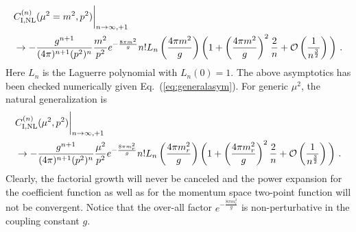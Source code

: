 \documentclass[a4paper,11pt]{article}
\begin{document}
\begin{align}\label{eq:asymfinal1}
& C_{{\rm I},{\rm NL}}^{(n)}(\mu^2=m^2,p^2)\bigg|_{n\rightarrow \infty,+1}\ \nonumber \\ 
& \rightarrow -\frac{g^{n+1}}{(4\pi)^{n+1}(p^2)^{n}}\frac{m^2}{p^2}e^{-\frac{8\pi m^2}{g}}n!L_n\left(\frac{4\pi m^2}{g}\right)\bigg(1+\left(\frac{4\pi m^2}{g}\right)^2\frac{2}{n}+{\cal O}\left(\frac{1}{n^{\frac{3}{2}}}\right)\bigg) \ .
\end{align}
Here $L_n$ is the Laguerre polynomial with $L_n(0)=1$. The above asymptotics  has been checked numerically given Eq.~(\ref{eq:generalasym}). For generic $\mu^2$, the natural generalization is 
\begin{align}\label{eq:asymfinal2}
& C_{{\rm I},{\rm NL}}^{(n)}(\mu^2,p^2)\bigg|_{n\rightarrow \infty,+1}\ \nonumber \\ 
& \rightarrow -\frac{g^{n+1}}{(4\pi)^{n+1}(p^2)^{n}}\frac{\mu^2}{p^2}e^{-\frac{8\pi m_r^2}{g}}n!L_n\left(\frac{4\pi m_r^2}{g}\right)\bigg(1+\left(\frac{4\pi m_r^2}{g}\right)^2\frac{2}{n}+{\cal O}\left(\frac{1}{n^{\frac{3}{2}}}\right)\bigg) \ .
\end{align}
Clearly, the factorial growth will never be canceled and the power expansion for the coefficient function as well as for the momentum space two-point function will not be convergent. Notice that the over-all factor $e^{-\frac{8\pi m_r^2}{g}}$ is non-perturbative in the coupling constant $g$. 
\end{document}
